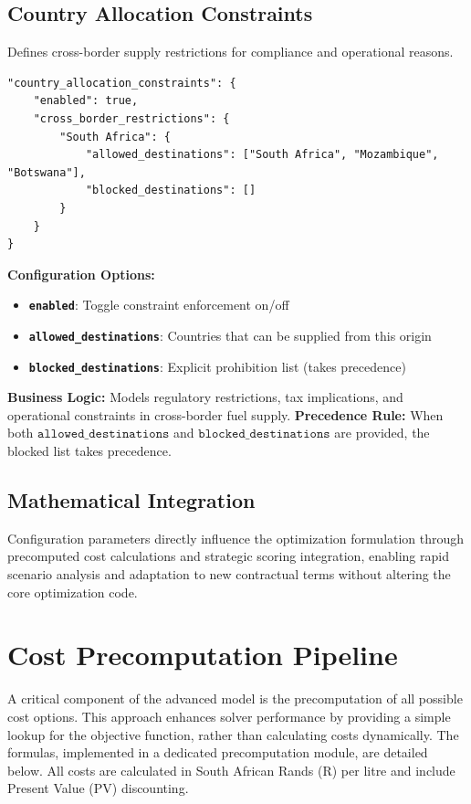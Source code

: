\subsection{Country Allocation Constraints}
Defines cross-border supply restrictions for compliance and operational reasons.

\begin{verbatim}
"country_allocation_constraints": {
    "enabled": true,
    "cross_border_restrictions": {
        "South Africa": {
            "allowed_destinations": ["South Africa", "Mozambique", "Botswana"],
            "blocked_destinations": []
        }
    }
}
\end{verbatim}

\textbf{Configuration Options:}
\begin{itemize}
    \item \textbf{\texttt{enabled}}: Toggle constraint enforcement on/off
    \item \textbf{\texttt{allowed\_destinations}}: Countries that can be supplied from this origin
    \item \textbf{\texttt{blocked\_destinations}}: Explicit prohibition list (takes precedence)
\end{itemize}

\textbf{Business Logic:} Models regulatory restrictions, tax implications, and operational constraints in cross-border fuel supply.
\textbf{Precedence Rule:} When both $\texttt{allowed\_destinations}$ and $\texttt{blocked\_destinations}$ are provided, the blocked list takes precedence.

\subsection{Mathematical Integration}
Configuration parameters directly influence the optimization formulation through precomputed cost calculations and strategic scoring integration, enabling rapid scenario analysis and adaptation to new contractual terms without altering the core optimization code.

\section{Cost Precomputation Pipeline}
A critical component of the advanced model is the precomputation of all possible cost options. This approach enhances solver performance by providing a simple lookup for the objective function, rather than calculating costs dynamically. The formulas, implemented in a dedicated precomputation module, are detailed below. All costs are calculated in South African Rands (R) per litre and include Present Value (PV) discounting.

